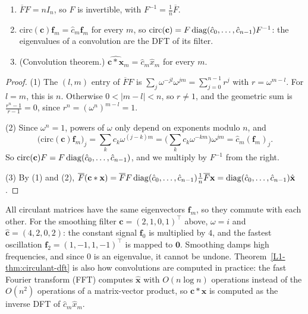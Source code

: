\begin{theorem}\label{L1-thm:circulant-dft}
    \begin{enumerate}
        \item $\overline{F}F = nI_n$, so $F$ is invertible, with $F^{-1} = \frac{1}{n}\overline{F}$.
        \item $\mathrm{circ}(\mathbf{c})\mathbf{f}_m = \hat{c}_m\mathbf{f}_m$ for every $m$, so $\mathrm{circ}(\mathbf{c}) = F\operatorname{diag}(\hat{c}_0, \ldots, \hat{c}_{n-1})F^{-1}$: the eigenvalues of a convolution are the DFT of its filter.
        \item (Convolution theorem.) $\widehat{\mathbf{c} \ast \mathbf{x}}_m = \hat{c}_m\hat{x}_m$ for every $m$.
    \end{enumerate}
\end{theorem}

\begin{proof}
    (1) The $(l, m)$ entry of $\overline{F}F$ is $\sum_j \omega^{-jl}\omega^{jm} = \sum_{j=0}^{n-1} r^j$ with $r = \omega^{m-l}$. For $l = m$, this is $n$. Otherwise $0 < |m - l| < n$, so $r \neq 1$, and the geometric sum is $\frac{r^n - 1}{r - 1} = 0$, since $r^n = (\omega^n)^{m-l} = 1$.

    (2) Since $\omega^n = 1$, powers of $\omega$ only depend on exponents modulo $n$, and
    \[\big(\mathrm{circ}(\mathbf{c})\mathbf{f}_m\big)_j = \sum_k c_k\omega^{(j-k)m} = \Big(\sum_k c_k\omega^{-km}\Big)\omega^{jm} = \hat{c}_m(\mathbf{f}_m)_j.\]
    So $\mathrm{circ}(\mathbf{c})F = F\operatorname{diag}(\hat{c}_0, \ldots, \hat{c}_{n-1})$, and we multiply by $F^{-1}$ from the right.

    (3) By (1) and (2), $\overline{F}(\mathbf{c} \ast \mathbf{x}) = \overline{F}F\operatorname{diag}(\hat{c}_0, \ldots, \hat{c}_{n-1})\frac{1}{n}\overline{F}\mathbf{x} = \operatorname{diag}(\hat{c}_0, \ldots, \hat{c}_{n-1})\hat{\mathbf{x}}$.
\end{proof}

All circulant matrices have the same eigenvectors $\mathbf{f}_m$, so they commute with each other. For the smoothing filter $\mathbf{c} = (2, 1, 0, 1)^\top$ above, $\omega = i$ and $\hat{\mathbf{c}} = (4, 2, 0, 2)$: the constant signal $\mathbf{f}_0$ is multiplied by $4$, and the fastest oscillation $\mathbf{f}_2 = (1, -1, 1, -1)^\top$ is mapped to $\mathbf{0}$. Smoothing damps high frequencies, and since $0$ is an eigenvalue, it cannot be undone. Theorem~\ref{L1-thm:circulant-dft} is also how convolutions are computed in practice: the fast Fourier transform (FFT) computes $\hat{\mathbf{x}}$ with $O(n\log n)$ operations instead of the $O(n^2)$ operations of a matrix-vector product, so $\mathbf{c} \ast \mathbf{x}$ is computed as the inverse DFT of $\hat{c}_m\hat{x}_m$.

